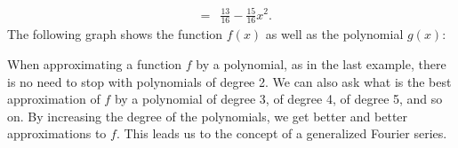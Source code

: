 \begin{solution}
\begin{eqnarray*}
    &=& \frac{13}{16} - \frac{15}{16}x^2.
  \end{eqnarray*}
  The following graph shows the function $f(x)$ as well as the
  polynomial $g(x)$:
  \begin{center}
  \end{center}
\end{solution}

When approximating a function $f$ by a polynomial, as in the last
example, there is no need to stop with polynomials of degree 2. We can
also ask what is the best approximation%
 of $f$ by a polynomial of
degree 3, of degree 4, of degree 5, and so on. By increasing the
degree of the polynomials, we get better and better approximations to
$f$. This leads us to the concept of a generalized Fourier series.

